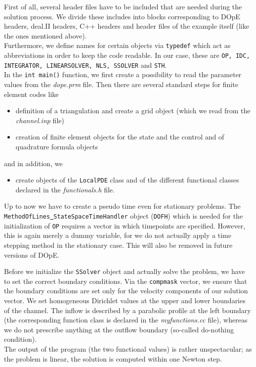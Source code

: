 First of all, several header files have to be included that are needed during the solution process. We divide these includes into blocks corresponding to DOpE headers, deal.II headers, C++ headers and header files of the example itself (like the ones mentioned above).\\
Furthermore, we define names for certain objects via \texttt{typedef} which act as abbreviations in order to keep the code readable. In our case, these are \texttt{OP, IDC, INTEGRATOR, LINEARSOLVER, NLS, SSOLVER} and \texttt{STH}.\\
In the \texttt{int main()} function, we first create a possibility to read the parameter values from the \textit{dope.prm} file. Then there are several standard steps for finite element codes like
\begin{itemize}
\item
definition of a triangulation and create a grid object (which we read from the \textit{channel.inp} file)
\item
creation of finite element objects for the state and the control and of quadrature formula objects
\end{itemize}
and in addition, we 
\begin{itemize}
\item
create objects of the \texttt{LocalPDE} class and of the different functional classes declared in the \textit{functionals.h} file.
\end{itemize}
\begin{remark}
Up to now  we have to create a pseudo time even for stationary problems. The \\\texttt{MethodOfLines\underline{ }StateSpaceTimeHandler} object (\texttt{DOFH}) which is needed for the initialization of \texttt{OP} requires a vector in which timepoints are specified. However, this is again merely a dummy variable, for we do not actually apply a time stepping method in the stationary case. This will also be removed in future versions of DOpE.\\
\end{remark}
Before we initialize the \texttt{SSolver} object and actually solve the problem, we have to set the correct boundary conditions. Via the \texttt{compmask} vector, we ensure that the boundary conditions are set only for the velocity components of our solution vector. We set homogeneous Dirichlet values at the upper and lower boundaries of the channel. The inflow is described by a parabolic profile at the left boundary (the corresponding function class is declared in the \textit{myfunctions.cc} file), whereas we do not prescribe anything at the outflow boundary (so-called do-nothing condition).\\
The output of the program (the two functional values) is rather unspectacular; as the problem is linear, the solution is computed within one Newton step.


